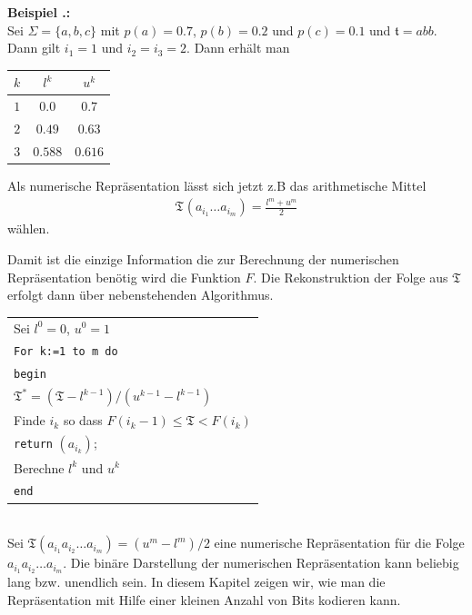 \documentclass[a4paper,12pt]{article}
\newcounter{Beispiel}
\newcounter{Algorithmus}
\newenvironment{Beispiel}{
\medskip
        
        \setlength{\parindent}{0pt}
        \addtocounter{Beispiel}{1}
        \textbf{\textsf{Beispiel \thesubsection.\theBeispiel}:}\\}{
        \nopagebreak
        \vspace{-1.0ex}
        \bigskip
        
}
\begin{document}
\begin{Beispiel}
Sei $\Sigma = \{a,b,c\}$ mit $p(a)=0.7$, $p(b) =0.2$ und $p(c)=0.1$ und $\mathfrak{t}=abb$.
Dann gilt $i_1=1$ und $i_2=i_3 =2$.
Dann erhält man
\begin{center}
\begin{tabular}{c|c|c}
$k$ & $l^k$ & $u^k$
\\
\hline
$1$ & $0.0$ & $0.7$
\\
\hline
$2$ & $0.49$ & $ 0.63$ 
\\
\hline
$3$ & $0.588$ & $0.616$
\end{tabular}
\end{center}
\end{Beispiel}
Als numerische Repräsentation lässt sich jetzt z.B das arithmetische Mittel
\begin{align*}
\mathfrak{T}^{}(a_{i_{1}}\ldots a_{i_{m}})= \frac{l^{m} + u^{m}}{2}
\end{align*}
wählen.
\vspace{0.5cm}
\\
\begin{minipage}[h]{.4\textwidth}
 Damit ist die einzige Information die zur Berechnung der numerischen Repräsentation benötig wird die Funktion $F$. Die Rekonstruktion der Folge aus $\mathfrak{T}$ erfolgt dann über nebenstehenden Algorithmus.
\vspace{0.5cm}
\\
\end{minipage}
\hfill
\begin{minipage}[h]{.5\textwidth}
\begin{tabular}{l}
Sei $l^{0}=0$, $u^{0}=1$
\\
{\tt{For k:=1 to m do}}
\\
{\tt{begin}}
\\
$\mathfrak{T}^{*}= (\mathfrak{T} - l^{k-1}) / (u^{k-1} - l^{k-1})$
\\
Finde $i_k$ so dass $F(i_k -1) \leq \mathfrak{T} < F(i_k)$
\\
{\tt{return}} $(a_{i_{k}})$;
\\
Berechne $l^{k}$ und $u^{k}$
\\
{\tt{end}}
\end{tabular}
\end{minipage}
\vspace{0.5cm}
\\
Sei $\mathfrak{T}(a_{i_{1}}a_{i_{2}}\ldots a_{i_{m}}) = (u^{m} - l^{m})/2$ eine numerische Repräsentation für die Folge $a_{i_{1}}a_{i_{2}}\ldots a_{i_{m}}$. Die binäre Darstellung der numerischen Repräsentation kann  beliebig lang bzw. unendlich sein. In diesem Kapitel zeigen wir, wie man die Repräsentation mit Hilfe einer kleinen Anzahl von Bits kodieren kann. 
\end{document}
